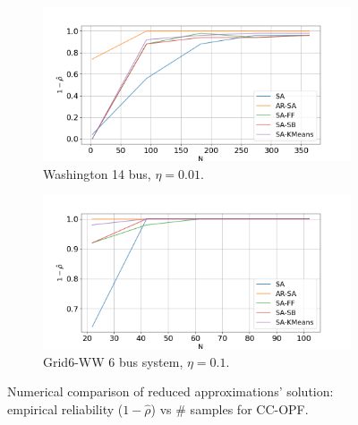 \begin{figure}[hbt]
    \centering
    \begin{subfigure}{.9\textwidth}
      \centering
      \hspace{-0mm}\includegraphics[width=0.99\linewidth]{Dissertation/images/dynamic/washington14/1_beta_N_363_eta_0.01.png}
      \caption{Washington 14 bus, $\eta = 0.01$.}
      \label{fig:washington14conservatism}
    \end{subfigure}
    
    \begin{subfigure}{.9\textwidth}
      \centering
      \hspace{0mm}\includegraphics[width=0.99\linewidth]{Dissertation/images/dynamic/grid6/1_beta_N_102_eta_0.1.png}
      \caption{Grid6-WW 6 bus system, $\eta = 0.1$.}
      \label{fig:grid6reliability}
    \end{subfigure}
    \caption{Numerical comparison of reduced approximations' solution: empirical reliability ($1-\hat{\rho}$) vs $\#$ samples for CC-OPF.  
    }
\label{fig:ar-sa-wash14-grid6}
\end{figure}

